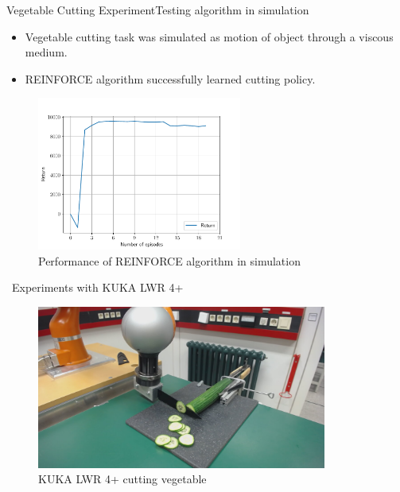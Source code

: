 \documentclass[aspectratio=43,10pt,fleqn,t]{beamer}
\begin{document}
\begin{frame}{Vegetable Cutting Experiment}{\small Testing algorithm in simulation}
	\vspace{-0.5cm}
	\begin{itemize}
		\item Vegetable cutting task was simulated as motion of object through a viscous medium.
		\item REINFORCE algorithm successfully learned cutting policy.
	\end{itemize}
	\vspace{-0.6cm}
	\begin{figure}
		\includegraphics[width=0.6\textwidth]{images/exp/cut/sim_return}
		\caption{Performance of REINFORCE algorithm in simulation}
	\end{figure}
\end{frame}

\begin{frame}{~}{\small Experiments with KUKA LWR 4+}
	\begin{figure}
	\centering
	\includegraphics[width=0.85\textwidth]{images/exp/cut_veg_exp}
	\caption{KUKA LWR 4+ cutting vegetable}
	\end{figure}

\end{frame}
\end{document}
